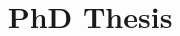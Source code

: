 \documentclass[a4paper,12pt,numbered,print,index]{PhDThesisPSnPDF}
\title{PhD Thesis}
\begin{document}
\frontmatter



%
%
%
%







\mainmatter


%
%
%
%
%
%





\begin{spacing}{0.9}



\cleardoublepage





\end{spacing}
\end{document}
